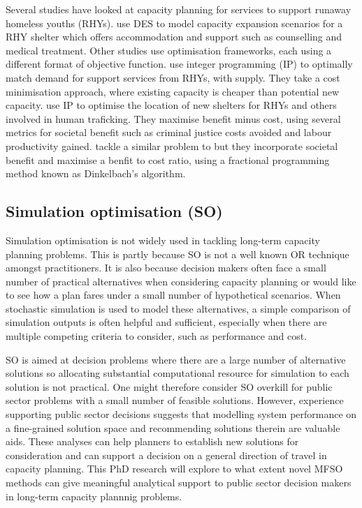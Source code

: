\documentclass[12pt,a4paper]{article}
\begin{document}
Several studies have looked at capacity planning for services to support runaway homeless youths (RHYs). \cite{kaya2022discrete} use DES to model capacity expansion scenarios for a RHY shelter which offers accommodation and support such as counselling and medical treatment. Other studies use optimisation frameworks, each using a different format of objective function. \cite{kaya2022improving} use integer programming (IP) to optimally match demand for support services from RHYs, with supply. They take a cost minimisation approach, where existing capacity is cheaper than potential new capacity. \cite{maass2020optimizing} use IP to optimise the location of new shelters for RHYs and others involved in human traficking. They maximise benefit minus cost, using several metrics for societal benefit such as criminal justice costs avoided and labour productivity gained. \cite{miller2022optimization} tackle a similar problem to \cite{kaya2022improving} but they incorporate societal benefit and maximise a benfit to cost ratio, using a fractional programming method known as Dinkelbach's algorithm. 

\subsection{Simulation optimisation (SO)} \label{so}

Simulation optimisation is not widely used in tackling long-term capacity planning problems. This is partly because SO is not a well known OR technique amongst practitioners. It is also because decision makers often face a small number of practical alternatives when considering capacity planning or would like to see how a plan fares under a small number of hypothetical scenarios. When stochastic simulation is used to model these alternatives, a simple comparison of simulation outputs is often helpful and sufficient, especially when there are multiple competing criteria to consider, such as performance and cost.

SO is aimed at decision problems where there are a large number of alternative solutions so allocating substantial computational resource for simulation to each solution is not practical. One might therefore consider SO overkill for public sector problems with a small number of feasible solutions. However, experience supporting public sector decisions suggests that modelling system performance on a fine-grained solution space and recommending solutions therein are valuable aids. These analyses can help planners to establish new solutions for consideration and can support a decision on a general direction of travel in capacity planning. This PhD research will explore to what extent novel MFSO methods can give meaningful analytical support to public sector decision makers in long-term capacity plannnig problems.
\end{document}
